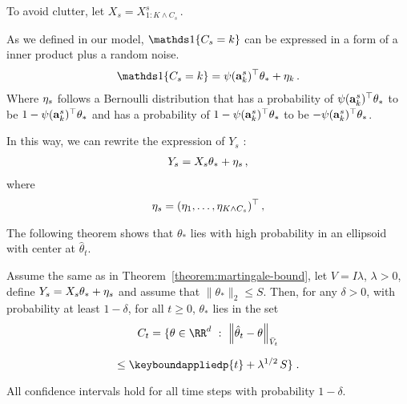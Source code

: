 To avoid clutter, let $X_s = X^s_{1 : K \wedge C_s}\,.$

As we defined in our model, $\I{C_s=k}$ can be expressed in a form of a inner product plus a random noise.
\begin{align*}
  \I{C_s=k} = \psi(\rnd{a}^s_k)^\top \theta_* + \rnd{\eta}_k \,.
\end{align*}
Where $ \mathbf{\eta}_s $ follows a Bernoulli distribution that
has a probability of $\psi(\mathbf{a}^s_k)^\top \theta_*$ to be $1 - \psi(\mathbf{a}^s_k)^\top \theta_*$
and has a probability of $1 - \psi(\mathbf{a}^s_k)^\top \theta_*$ to be $-\psi(\mathbf{a}^s_k)^\top \theta_*$.

In this way, we can rewrite the expression of $Y_s$ :
\begin{align*}
  Y_s = X_s \theta_* + \mathbf{\eta}_s \,,
\end{align*}
where
\begin{align*}
  \mathbf{\eta}_s = (\mathbf{\eta}_1, \dots, \mathbf{\eta}_{K \wedge C_s})^\top \,,
\end{align*}

The following theorem shows that $\theta_*$ lies with high probability in an
ellipsoid with center at $\hat{\theta}_t$.

\begin{theorem}
\label{theorem:confidence-ellipsoid}
Assume the same as in Theorem~\ref{theorem:martingale-bound}, let $V = I \lambda$, $\lambda > 0$, define
$Y_s = X_s \theta_* + \mathbf{\eta}_s$ and assume that $\|\theta_*\|_2 \le S$. Then, for any $\delta > 0$, with probability at least $1-\delta$,
for all $t \ge 0$, $\theta_*$ lies in the set
$$
C_t = \{ \theta \in \RR^d ~:~ \norm{\hat{\theta}_t -  \theta}_{\bar{V}_{t}}
$$

$$
\le \keyboundappliedp{t} + \lambda^{1/2}\, S \} \; .
$$

All confidence intervals hold for all time steps with probability $1-\delta$.

\end{theorem}

